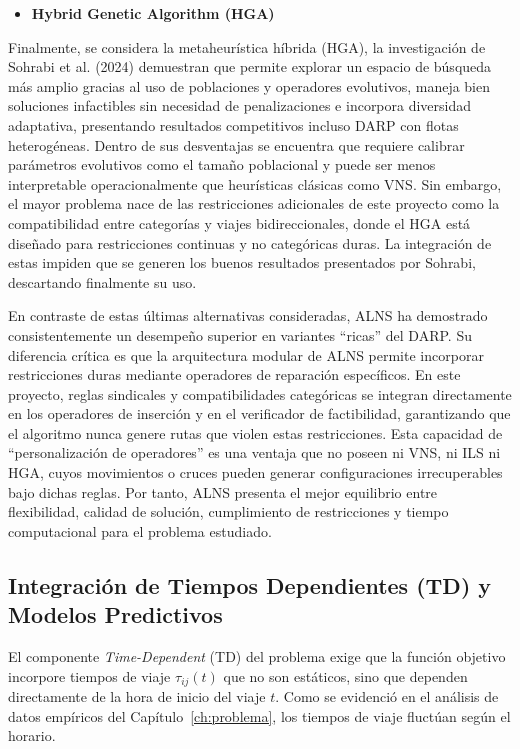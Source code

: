 \begin{itemize}
    \item \textbf{Hybrid Genetic Algorithm (HGA) \cite{Sohrabi2024}}
\end{itemize}
Finalmente, se considera la metaheurística híbrida (HGA), la investigación de Sohrabi et al. (2024) demuestran que permite explorar un espacio de búsqueda más amplio gracias al uso de poblaciones y operadores evolutivos, maneja bien soluciones infactibles sin necesidad de penalizaciones e incorpora diversidad adaptativa, presentando resultados competitivos incluso DARP con flotas heterogéneas. Dentro de sus desventajas se encuentra que requiere calibrar parámetros evolutivos como el tamaño poblacional y puede ser menos interpretable operacionalmente que heurísticas clásicas como VNS. Sin embargo, el mayor problema nace de las restricciones adicionales de este proyecto como la compatibilidad entre categorías y viajes bidireccionales, donde el HGA está diseñado para restricciones continuas y no categóricas duras. La integración de estas impiden que se generen los buenos resultados presentados por Sohrabi, descartando finalmente su uso.

En contraste de estas últimas alternativas consideradas, ALNS ha demostrado consistentemente un desempeño superior en variantes “ricas” del DARP. Su diferencia crítica es que la arquitectura modular de ALNS permite incorporar restricciones duras mediante operadores de reparación específicos. En este proyecto, reglas sindicales y compatibilidades categóricas se integran directamente en los operadores de inserción y en el verificador de factibilidad, garantizando que el algoritmo nunca genere rutas que violen estas restricciones. Esta capacidad de “personalización de operadores” es una ventaja que no poseen ni VNS, ni ILS ni HGA, cuyos movimientos o cruces pueden generar configuraciones irrecuperables bajo dichas reglas. Por tanto, ALNS presenta el mejor equilibrio entre flexibilidad, calidad de solución, cumplimiento de restricciones y tiempo computacional para el problema estudiado.



\subsection{Integración de Tiempos Dependientes (TD) y Modelos Predictivos}
El componente \textit{Time-Dependent} (TD) del problema exige que la función objetivo incorpore tiempos de viaje $\tau_{ij}(t)$ que no son estáticos, sino que dependen directamente de la hora de inicio del viaje $t$. Como se evidenció en el análisis de datos empíricos del Capítulo~\ref{ch:problema}, los tiempos de viaje fluctúan según el horario.

